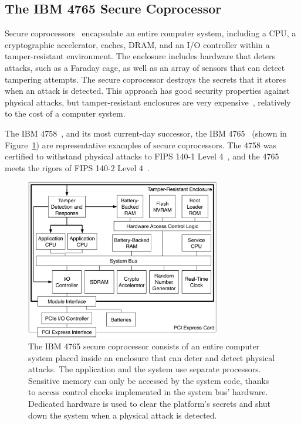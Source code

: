 \subsection{The IBM 4765 Secure Coprocessor}

Secure coprocessors~\cite{yee1994coprocessors} encapsulate an entire computer
system, including a CPU, a cryptographic accelerator, caches, DRAM, and an I/O
controller within a tamper-resistant environment. The enclosure includes
hardware that deters attacks, such as a Faraday cage, as well as an array of
sensors that can detect tampering attempts. The secure coprocessor destroys the
secrets that it stores when an attack is detected. This approach has good
security properties against physical attacks, but tamper-resistant enclosures
are very expensive~\cite{anderson2001security}, relatively to the cost of a
computer system.

The IBM 4758~\cite{smith1999ibm4758}, and its most current-day successor, the
IBM 4765~\cite{nist2015ibm4765} (shown in Figure~\ref{fig:ibm_4765}) are
representative examples of secure coprocessors. The 4758 was certified to
withstand physical attacks to FIPS 140-1 Level 4~\cite{smith1999validating},
and the 4765 meets the rigors of FIPS 140-2 Level 4~\cite{nist2011fipscert}.

\begin{figure}[hbt]
  \centering
  \includegraphics[width=85mm]{figures/ibm_4765.pdf}
  \caption{
    The IBM 4765 secure coprocessor consists of an entire computer system
    placed inside an enclosure that can deter and detect physical attacks.
    The application and the system use separate processors. Sensitive memory
    can only be accessed by the system code, thanks to access control checks
    implemented in the system bus' hardware. Dedicated hardware is used to clear
    the platform's secrets and shut down the system when a physical attack is
    detected.
  }
  \label{fig:ibm_4765}
\end{figure}

